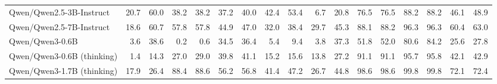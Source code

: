 \documentclass{article}
\begin{document}
\begin{table}[htbp]
\begin{threeparttable}
\begin{adjustbox}{max width=\textwidth}
\begin{tabular}{lrrrrrrrrrrrrrrrr}
Qwen/Qwen2.5-3B-Instruct & \cellcolor[HTML]{FEFDFC}20.7 & \cellcolor[HTML]{C9E2EE}60.0 & \cellcolor[HTML]{FCEAE2}38.2 & \cellcolor[HTML]{FCE9E1}38.2 & \cellcolor[HTML]{FDF0EA}37.2 & \cellcolor[HTML]{F9D3C1}40.0 & \cellcolor[HTML]{EAF3F8}42.4 & \cellcolor[HTML]{D4E8F2}53.4 & \cellcolor[HTML]{F6BBA1}6.7 & \cellcolor[HTML]{F4A582}20.8 & \cellcolor[HTML]{C5E0ED}76.5 & \cellcolor[HTML]{DFEEF5}76.5 & \cellcolor[HTML]{ABD2E5}88.2 & \cellcolor[HTML]{E2EFF6}88.2 & \cellcolor[HTML]{FEFEFE}46.1 & \cellcolor[HTML]{FEF8F6}48.9 \\
Qwen/Qwen2.5-7B-Instruct & \cellcolor[HTML]{FDF4F0}18.6 & \cellcolor[HTML]{C7E1EE}60.7 & \cellcolor[HTML]{EDF5F9}57.8 & \cellcolor[HTML]{EDF5F9}57.8 & \cellcolor[HTML]{FEFEFE}44.9 & \cellcolor[HTML]{FBE5DC}47.0 & \cellcolor[HTML]{FDF5F2}32.0 & \cellcolor[HTML]{FEF7F4}38.4 & \cellcolor[HTML]{F0F7FA}29.7 & \cellcolor[HTML]{F6FAFC}45.3 & \cellcolor[HTML]{ABD2E5}88.1 & \cellcolor[HTML]{B9D9E9}88.2 & \cellcolor[HTML]{9AC9E0}96.3 & \cellcolor[HTML]{ABD2E5}96.3 & \cellcolor[HTML]{DEEDF5}60.4 & \cellcolor[HTML]{E1EFF6}63.0 \\
Qwen/Qwen3-0.6B & \cellcolor[HTML]{F5B497}3.6 & \cellcolor[HTML]{FCECE4}38.6 & \cellcolor[HTML]{F4A582}0.2 & \cellcolor[HTML]{F4A582}0.6 & \cellcolor[HTML]{FCEAE2}34.5 & \cellcolor[HTML]{F8C9B4}36.4 & \cellcolor[HTML]{F5B294}5.4 & \cellcolor[HTML]{F4A582}9.4 & \cellcolor[HTML]{F5B294}3.8 & \cellcolor[HTML]{FCE6DC}37.3 & \cellcolor[HTML]{FAFCFD}51.8 & \cellcolor[HTML]{F9D5C5}52.0 & \cellcolor[HTML]{BCDBEA}80.6 & \cellcolor[HTML]{FDFEFE}84.2 & \cellcolor[HTML]{FAD6C6}25.6 & \cellcolor[HTML]{F8CAB6}27.8 \\
Qwen/Qwen3-0.6B (thinking) & \cellcolor[HTML]{F4AB8A}1.4 & \cellcolor[HTML]{F4A582}14.3 & \cellcolor[HTML]{F9D5C5}27.0 & \cellcolor[HTML]{FAD9CA}29.0 & \cellcolor[HTML]{FDF5F1}39.8 & \cellcolor[HTML]{F9D6C6}41.1 & \cellcolor[HTML]{F8CBB7}15.2 & \cellcolor[HTML]{F6B69A}15.6 & \cellcolor[HTML]{F9D4C4}13.8 & \cellcolor[HTML]{F7BEA4}27.2 & \cellcolor[HTML]{A5CFE3}91.1 & \cellcolor[HTML]{AFD4E6}91.1 & \cellcolor[HTML]{9BC9E0}95.7 & \cellcolor[HTML]{AED4E6}95.8 & \cellcolor[HTML]{FDF6F3}42.1 & \cellcolor[HTML]{FCEBE4}42.9 \\
Qwen/Qwen3-1.7B (thinking) & \cellcolor[HTML]{FDF1EB}17.9 & \cellcolor[HTML]{F8C8B3}26.4 & \cellcolor[HTML]{AAD1E5}88.4 & \cellcolor[HTML]{A9D1E5}88.6 & \cellcolor[HTML]{E2EFF6}56.2 & \cellcolor[HTML]{FDFEFE}56.8 & \cellcolor[HTML]{EDF5F9}41.4 & \cellcolor[HTML]{E9F3F8}47.2 & \cellcolor[HTML]{FCFDFE}26.7 & \cellcolor[HTML]{F8FBFD}44.8 & \cellcolor[HTML]{94C6DE}98.6 & \cellcolor[HTML]{96C7DF}98.6 & \cellcolor[HTML]{92C5DE}99.8 & \cellcolor[HTML]{93C5DE}99.8 & \cellcolor[HTML]{C2DEEC}72.1 & \cellcolor[HTML]{C8E1EE}72.4 \\

\end{tabular}
\end{adjustbox}
\end{threeparttable}
\end{table}
\end{document}
